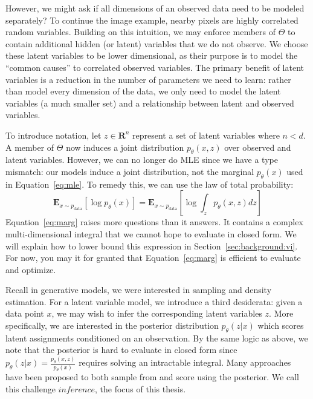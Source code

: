 However, we might ask if all dimensions of an observed data need to be modeled separately? To continue the image example, nearby pixels are highly correlated random variables. Building on this intuition, we may enforce members of $\Theta$ to contain additional hidden (or latent) variables that we do not observe. We choose these latent variables to be lower dimensional, as their purpose is to model the ``common causes'' to correlated observed variables. The primary benefit of latent variables is a reduction in the number of parameters we need to learn: rather than model every dimension of the data, we only need to model the latent variables (a much smaller set) and a relationship between latent and observed variables. 

To introduce notation, let $z \in \mathbf{R}^n$ represent a set of latent variables where $n < d$. A member of $\Theta$ now induces a joint distribution $p_\theta(x, z)$ over observed and latent variables. However, we can no longer do MLE since we have a type mismatch: our models induce a joint distribution, not the marginal $p_\theta(x)$ used in Equation~\ref{eq:mle}. To remedy this, we can use the law of total probability: 
\begin{equation}
    \mathbf{E}_{x \sim p_{\text{data}}}\left[\log p_\theta(x) \right] = \mathbf{E}_{x \sim p_{\text{data}}} \left[ \log \int_z p_\theta(x, z) dz \right]
    \label{eq:marg}
\end{equation}
Equation~\ref{eq:marg} raises more questions than it answers. It contains a complex multi-dimensional integral that we cannot hope to evaluate in closed form. We will explain how to lower bound this expression in Section~\ref{sec:background:vi}. For now, you may it for granted that Equation~\ref{eq:marg} is efficient to evaluate and optimize.

Recall in generative models, we were interested in sampling and density estimation. For a latent variable model, we introduce a third desiderata: given a data point $x$, we may wish to infer the corresponding latent variables $z$. More specifically, we are interested in the posterior distribution $p_\theta(z|x)$ which scores latent assignments conditioned on an observation. By the same logic as above, we note that the posterior is hard to evaluate in closed form since $p_\theta(z|x) = \frac{p_\theta(x,z)}{p_\theta(x)}$ requires solving an intractable integral. Many approaches have been proposed to both sample from and score using the posterior.  We call this challenge $\textit{inference}$, the focus of this thesis.

